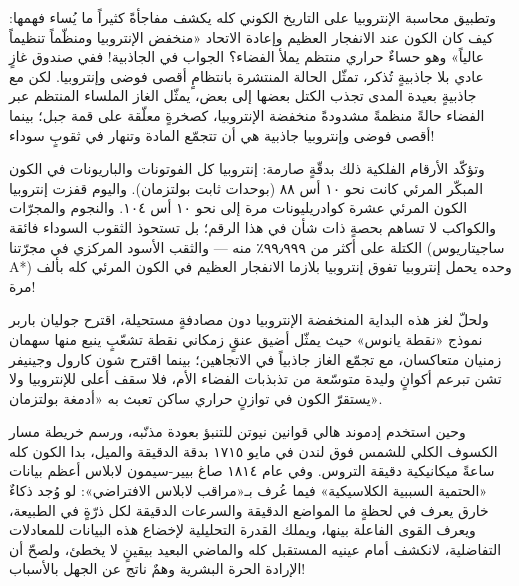 \documentclass[12pt,a4paper,openany]{book}
\begin{document}
وتطبيق محاسبة الإنتروبيا على التاريخ الكوني كله يكشف مفاجأةً كثيراً ما يُساء فهمها: كيف كان الكون عند الانفجار العظيم وإعادة الاتحاد «منخفض الإنتروبيا ومنظّماً تنظيماً عالياً» وهو حساءٌ حراري منتظم يملأ الفضاء؟ الجواب في الجاذبية! ففي صندوق غازٍ عادي بلا جاذبيةٍ تُذكر، تمثّل الحالة المنتشرة بانتظامٍ أقصى فوضى وإنتروبيا. لكن مع جاذبيةٍ بعيدة المدى تجذب الكتل بعضها إلى بعض، يمثّل الغاز الملساء المنتظم عبر الفضاء حالةً منظمةً مشدودةً منخفضة الإنتروبيا، كصخرةٍ معلّقة على قمة جبل؛ بينما أقصى فوضى وإنتروبيا جاذبية هي أن تتجمّع المادة وتنهار في ثقوبٍ سوداء!


وتؤكّد الأرقام الفلكية ذلك بدقّةٍ صارمة: إنتروبيا كل الفوتونات والباريونات في الكون المبكّر المرئي كانت نحو ١٠ أس ٨٨ (بوحدات ثابت بولتزمان). واليوم قفزت إنتروبيا الكون المرئي عشرة كوادريليونات مرة إلى نحو ١٠ أس ١٠٤. والنجوم والمجرّات والكواكب لا تساهم بحصةٍ ذات شأن في هذا الرقم؛ بل تستحوذ الثقوب السوداء فائقة الكتلة على أكثر من ٩٩٫٩٩٩٪ منه — والثقب الأسود المركزي في مجرّتنا (ساجيتاريوس A*) وحده يحمل إنتروبيا تفوق إنتروبيا بلازما الانفجار العظيم في الكون المرئي كله بألف مرة!


ولحلّ لغز هذه البداية المنخفضة الإنتروبيا دون مصادفةٍ مستحيلة، اقترح جوليان باربر نموذج «نقطة يانوس» حيث يمثّل أضيق عنقٍ زمكاني نقطة تشعّبٍ ينبع منها سهمان زمنيان متعاكسان، مع تجمّع الغاز جاذبياً في الاتجاهين؛ بينما اقترح شون كارول وجينيفر تشن تبرعم أكوانٍ وليدة متوسّعة من تذبذبات الفضاء الأم، فلا سقف أعلى للإنتروبيا ولا يستقرّ الكون في توازنٍ حراري ساكن تعبث به «أدمغة بولتزمان».


وحين استخدم إدموند هالي قوانين نيوتن للتنبؤ بعودة مذنّبه، ورسم خريطة مسار الكسوف الكلي للشمس فوق لندن في مايو ١٧١٥ بدقة الدقيقة والميل، بدا الكون كله ساعةً ميكانيكية دقيقة التروس. وفي عام ١٨١٤ صاغ بيير-سيمون لابلاس أعظم بيانات «الحتمية السببية الكلاسيكية» فيما عُرف بـ«مراقب لابلاس الافتراضي»: لو وُجد ذكاءٌ خارق يعرف في لحظةٍ ما المواضع الدقيقة والسرعات الدقيقة لكل ذرّةٍ في الطبيعة، ويعرف القوى الفاعلة بينها، ويملك القدرة التحليلية لإخضاع هذه البيانات للمعادلات التفاضلية، لانكشف أمام عينيه المستقبل كله والماضي البعيد بيقينٍ لا يخطئ، ولصحّ أن الإرادة الحرة البشرية وهمٌ ناتج عن الجهل بالأسباب!
\end{document}

